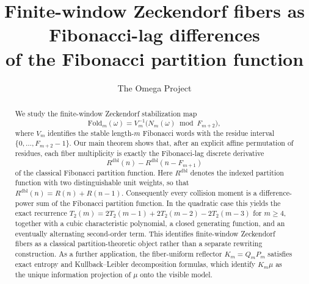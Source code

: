 \documentclass[12pt,reqno]{amsart}
\title[Finite-window Zeckendorf fibers]{%
  Finite-window Zeckendorf fibers as Fibonacci-lag differences\\
  of the Fibonacci partition function}
\author{The Omega Project}
\date{}
\theoremstyle{plain}
\theoremstyle{definition}
\numberwithin{equation}{section}
\newcommand{\Fold}{\mathrm{Fold}}
\begin{document}
\begin{abstract}
We study the finite-window Zeckendorf stabilization map
\[
  \Fold_m(\omega)=V_m^{-1}\bigl(N_m(\omega)\bmod F_{m+2}\bigr),
\]
where \(V_m\) identifies the stable length-\(m\) Fibonacci words with the
residue interval \(\{0,\dots,F_{m+2}-1\}\).  Our main theorem shows that, after
an explicit affine permutation of residues, each fiber multiplicity is exactly
the Fibonacci-lag discrete derivative
\[
  R^{\mathrm{dbl}}(n)-R^{\mathrm{dbl}}(n-F_{m+1})
\]
of the classical Fibonacci partition function.  Here
\(R^{\mathrm{dbl}}\) denotes the indexed partition function with two
distinguishable unit weights, so that
\(R^{\mathrm{dbl}}(n)=R(n)+R(n-1)\).  Consequently every collision moment is a
difference-power sum of the Fibonacci partition function.  In the quadratic
case this yields the exact recurrence
\(T_2(m)=2T_2(m-1)+2T_2(m-2)-2T_2(m-3)\) for \(m\ge 4\), together with a cubic
characteristic polynomial, a closed generating function, and an eventually
alternating second-order term.  This identifies finite-window Zeckendorf fibers
as a classical partition-theoretic object rather than a separate rewriting
construction.  As a further application, the fiber-uniform reflector
\(K_m=Q_mP_m\) satisfies exact entropy and Kullback--Leibler decomposition
formulas, which identify \(K_m\mu\) as the unique information projection of
\(\mu\) onto the visible model.
\end{abstract}

\maketitle









\end{document}
